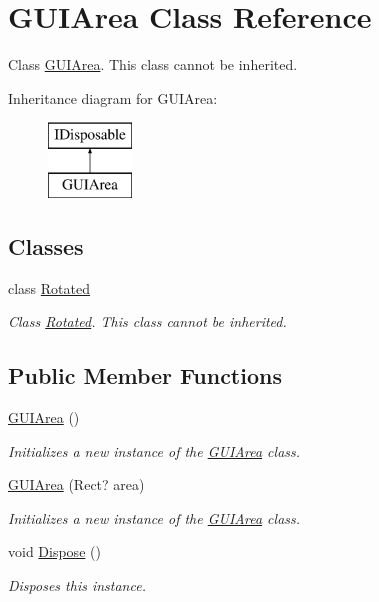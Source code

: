 \hypertarget{class_g_u_i_area}{}\section{G\+U\+I\+Area Class Reference}
\label{class_g_u_i_area}


Class \hyperlink{class_g_u_i_area}{G\+U\+I\+Area}. This class cannot be inherited.  


Inheritance diagram for G\+U\+I\+Area\+:\begin{figure}[H]
\begin{center}
\leavevmode
\includegraphics[height=2.000000cm]{class_g_u_i_area}
\end{center}
\end{figure}
\subsection*{Classes}
\begin{DoxyCompactItemize}
\item 
class \hyperlink{class_g_u_i_area_1_1_rotated}{Rotated}
\begin{DoxyCompactList}\small\item\em Class \hyperlink{class_g_u_i_area_1_1_rotated}{Rotated}. This class cannot be inherited. \end{DoxyCompactList}\end{DoxyCompactItemize}
\subsection*{Public Member Functions}
\begin{DoxyCompactItemize}
\item 
\hyperlink{class_g_u_i_area_a05cd884c7434979172adffe1b00b1b00}{G\+U\+I\+Area} ()
\begin{DoxyCompactList}\small\item\em Initializes a new instance of the \hyperlink{class_g_u_i_area}{G\+U\+I\+Area} class. \end{DoxyCompactList}\item 
\hyperlink{class_g_u_i_area_a1c687ef38e01337aa39c0b72d86e62eb}{G\+U\+I\+Area} (Rect? area)
\begin{DoxyCompactList}\small\item\em Initializes a new instance of the \hyperlink{class_g_u_i_area}{G\+U\+I\+Area} class. \end{DoxyCompactList}\item 
void \hyperlink{class_g_u_i_area_a984f752358d120763927e638d90afd02}{Dispose} ()
\begin{DoxyCompactList}\small\item\em Disposes this instance. \end{DoxyCompactList}\end{DoxyCompactItemize}
